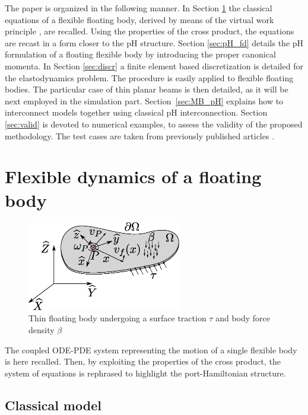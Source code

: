 \documentclass{svjour3}                     %
\begin{document}
\indent The paper is organized in the following manner. In Section \ref{sec:class_model} the classical equations of a flexible floating body, derived by means of the virtual work principle \cite{MB_Daepde,simeon2013computational}, are recalled. Using the properties of the cross product, the equations are recast in a form closer to the pH structure. Section \ref{sec:pH_fd} details the pH formulation of a floating flexible body by introducing the proper canonical momenta. In Section \ref{sec:discr} a finite element based discretization is detailed for the elastodynamics problem. The procedure is easily applied to flexible floating bodies. The particular case of thin planar beams is then detailed, as it will be next employed in the simulation part. Section~\ref{sec:MB_pH} explains how to interconnect models together using classical pH interconnection. Section \ref{sec:valid} is devoted to numerical examples, to assess the validity of the proposed methodology. The test cases are taken from previously published articles \cite{Chebbi2017,Ellenbroek2018}.

 

\section{Flexible dynamics of a floating body}
\label{sec:class_model}

\begin{figure}[t]
	\centering
	\includegraphics[width=0.6\textwidth]{floating_body.eps} 
	\caption{Thin floating body undergoing a surface traction $\tau$ and body force density $\beta$}
	\label{fig:float_body}
\end{figure}
The coupled ODE-PDE system representing the motion of a single flexible body is here recalled. Then, by exploiting the properties of the cross product, the system of equations is rephrased to highlight the port-Hamiltonian structure.

\subsection{Classical model}
\end{document}
